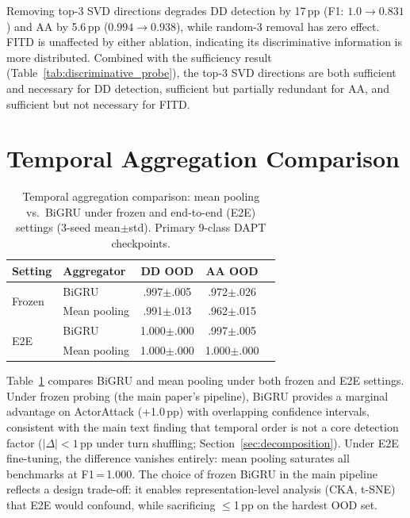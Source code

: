 Removing top-3 SVD directions degrades DD detection by 17\,pp (F1: $1.0 \to 0.831$) and AA by 5.6\,pp ($0.994 \to 0.938$), while random-3 removal has zero effect. FITD is unaffected by either ablation, indicating its discriminative information is more distributed. Combined with the sufficiency result (Table~\ref{tab:discriminative_probe}), the top-3 SVD directions are both sufficient and necessary for DD detection, sufficient but partially redundant for AA, and sufficient but not necessary for FITD.

\section{Temporal Aggregation Comparison}
\label{app:temporal}

\begin{table}[ht]
\centering
\footnotesize
\caption{Temporal aggregation comparison: mean pooling vs.\ BiGRU under frozen and end-to-end (E2E) settings (3-seed mean$\pm$std). Primary 9-class DAPT checkpoints.}
\label{tab:temporal}
\begin{tabular}{@{}llccc@{}}
\toprule
\textbf{Setting} & \textbf{Aggregator} & DD OOD & AA OOD \\
\midrule
\multirow{2}{*}{Frozen} & BiGRU & .997$\pm$.005 & .972$\pm$.026 \\
& Mean pooling & .991$\pm$.013 & .962$\pm$.015 \\
\midrule
\multirow{2}{*}{E2E} & BiGRU & 1.000$\pm$.000 & .997$\pm$.005 \\
& Mean pooling & 1.000$\pm$.000 & 1.000$\pm$.000 \\
\bottomrule
\end{tabular}
\end{table}

Table~\ref{tab:temporal} compares BiGRU and mean pooling under both frozen and E2E settings. Under frozen probing (the main paper's pipeline), BiGRU provides a marginal advantage on ActorAttack (+1.0\,pp) with overlapping confidence intervals, consistent with the main text finding that temporal order is not a core detection factor ($|\Delta| < 1$\,pp under turn shuffling; Section~\ref{sec:decomposition}). Under E2E fine-tuning, the difference vanishes entirely: mean pooling saturates all benchmarks at F1\,=\,1.000. The choice of frozen BiGRU in the main pipeline reflects a design trade-off: it enables representation-level analysis (CKA, t-SNE) that E2E would confound, while sacrificing $\leq$1\,pp on the hardest OOD set.


